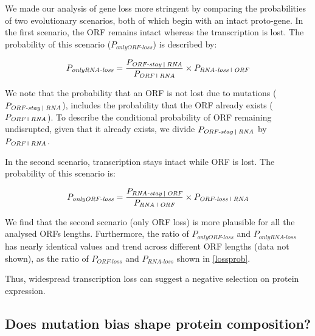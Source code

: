 \documentclass[12pt,a4paper]{article}
\begin{document}
We made our analysis of gene loss more stringent by comparing the probabilities of two evolutionary scenarios, both of which begin with an intact proto-gene. In the first scenario, the ORF remains intact whereas the transcription is lost. The probability of this scenario ($P_\textit{onlyORF-loss}$) is described by: 

\vspace{-1ex}

\begin{equation}
P_\textit{onlyRNA-loss} = \frac{P_\textit{ORF-stay \vline\ RNA}}{P_\textit{ORF \vline \ RNA}} \times P_\textit{RNA-loss \vline\ ORF}
\end{equation}

We note that the probability that an ORF is not lost due to mutations ($P_\textit{ORF-stay \vline \ RNA}$), includes the probability that the ORF already exists ($P_\textit{ORF \vline \ RNA}$). To describe the conditional probability of ORF remaining undisrupted, given that it already exists, we divide $P_\textit{ORF-stay \vline \ RNA}$ by $P_\textit{ORF \vline \ RNA}$.

In the second scenario, transcription stays intact while ORF is lost. The probability of this scenario is: 

\vspace{-1em}
\begin{equation}
P_\textit{onlyORF-loss} = \frac{P_\textit{RNA-stay \vline\ ORF}}{P_\textit{RNA \vline \ ORF}} \times P_\textit{ORF-loss \vline\ RNA}
\end{equation}

We find that the second scenario (only ORF loss) is more plausible for all the analysed ORFs lengths. Furthermore, the ratio of $P_\textit{onlyORF-loss}$ and $P_\textit{onlyRNA-loss}$ has nearly identical values and trend across different ORF lengths (data not shown), as the ratio of $P_\textit{ORF-loss}$ and $P_\textit{RNA-loss}$ shown in \autoref{lossprob}.

Thus, widespread transcription loss can suggest a negative selection on protein expression.


\subsection{Does mutation bias shape protein composition?}
\end{document}
